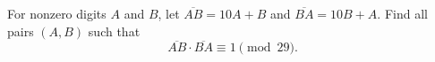 For nonzero digits $A$ and $B$, let $\overline{AB}=10A+B$ and $\overline{BA}=10B+A$. Find all pairs $(A,B)$ such that
\[\overline{AB}\cdot\overline{BA}\equiv1\pmod{29}.\]
